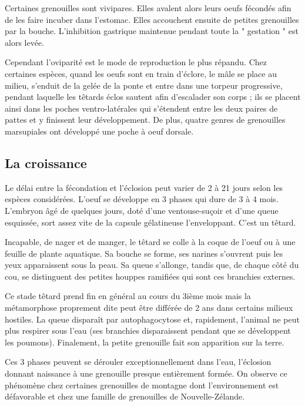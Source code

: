 Certaines grenouilles sont vivipares. 
Elles avalent alors leurs oeufs fécondés afin de les faire incuber dans l’estomac. 
Elles accouchent ensuite de petites grenouilles par la bouche. 
L’inhibition gastrique maintenue pendant toute la " gestation " est alors levée.

Cependant l’oviparité est le mode de reproduction le plus répandu. 
Chez certaines espèces, quand les oeufs sont en train d’éclore, le mâle se place au milieu, s’enduit de la gelée de la ponte et entre dans une torpeur progressive, pendant laquelle les têtards éclos sautent afin d’escalader son corps ; ils se placent ainsi dans les poches ventro-latérales qui s’étendent entre les deux paires de pattes et y finissent leur développement. 
De plus, quatre genres de grenouilles marsupiales ont développé une poche à oeuf dorsale.

         

\subsection{La croissance}

Le délai entre la fécondation et l’éclosion peut varier de 2 à 21 jours selon les espèces considérées. 
L’oeuf se développe en 3 phases qui dure de 3 à 4 mois. 
L’embryon âgé de quelques jours, doté d’une ventouse-suçoir et d’une queue esquissée, sort assez vite de la capsule gélatineuse l’enveloppant. 
C’est un têtard.

Incapable, de nager et de manger, le têtard se colle à la coque de l’oeuf ou à une feuille de plante aquatique. 
Sa bouche se forme, ses narines s’ouvrent puis les yeux apparaissent sous la peau. 
Sa queue s’allonge, tandis que, de chaque côté du cou, se distinguent des petites houppes ramifiées qui sont ces branchies externes.

Ce stade têtard prend fin en général au cours du 3ième mois mais la métamorphose proprement dite peut être différée de 2 ans dans certains milieux hostiles. 
La queue disparaît par autophagocytose et, rapidement, l’animal ne peut plus respirer sous l’eau (ses branchies disparaissent pendant que se développent les poumons).
Finalement, la petite grenouille fait son apparition sur la terre.

Ces 3 phases peuvent se dérouler exceptionnellement dans l’eau, l’éclosion donnant naissance à une grenouille presque entièrement formée. 
On observe ce phénomène chez certaines grenouilles de montagne dont l’environnement est défavorable et chez une famille de grenouilles de Nouvelle-Zélande.
        	
